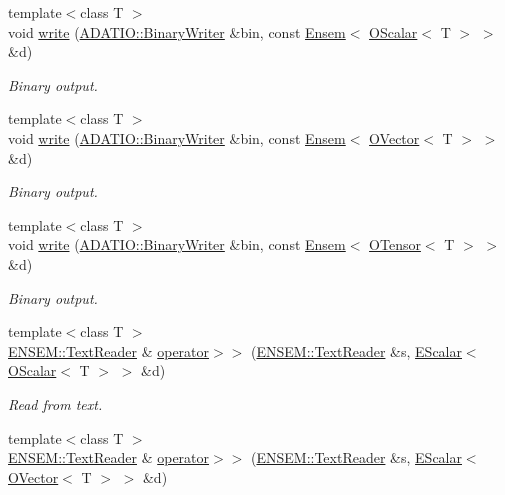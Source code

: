 \begin{DoxyCompactItemize}
{\footnotesize template$<$class T $>$ }\\void \mbox{\hyperlink{namespaceENSEM_afee4cf5df7a009f056b6ea0bca81c639}{write}} (\mbox{\hyperlink{classADATIO_1_1BinaryWriter}{A\+D\+A\+T\+I\+O\+::\+Binary\+Writer}} \&bin, const \mbox{\hyperlink{classENSEM_1_1Ensem}{Ensem}}$<$ \mbox{\hyperlink{classENSEM_1_1OScalar}{O\+Scalar}}$<$ T $>$ $>$ \&d)
\begin{DoxyCompactList}\small\item\em Binary output. \end{DoxyCompactList}\item 
{\footnotesize template$<$class T $>$ }\\void \mbox{\hyperlink{namespaceENSEM_a08ef39649c7f1ffb49d89bb6dc416676}{write}} (\mbox{\hyperlink{classADATIO_1_1BinaryWriter}{A\+D\+A\+T\+I\+O\+::\+Binary\+Writer}} \&bin, const \mbox{\hyperlink{classENSEM_1_1Ensem}{Ensem}}$<$ \mbox{\hyperlink{classENSEM_1_1OVector}{O\+Vector}}$<$ T $>$ $>$ \&d)
\begin{DoxyCompactList}\small\item\em Binary output. \end{DoxyCompactList}\item 
{\footnotesize template$<$class T $>$ }\\void \mbox{\hyperlink{namespaceENSEM_afe08b2232fc0a37c7998d170fcf26ec0}{write}} (\mbox{\hyperlink{classADATIO_1_1BinaryWriter}{A\+D\+A\+T\+I\+O\+::\+Binary\+Writer}} \&bin, const \mbox{\hyperlink{classENSEM_1_1Ensem}{Ensem}}$<$ \mbox{\hyperlink{classENSEM_1_1OTensor}{O\+Tensor}}$<$ T $>$ $>$ \&d)
\begin{DoxyCompactList}\small\item\em Binary output. \end{DoxyCompactList}\item 
{\footnotesize template$<$class T $>$ }\\\mbox{\hyperlink{classENSEM_1_1TextReader}{E\+N\+S\+E\+M\+::\+Text\+Reader}} \& \mbox{\hyperlink{namespaceENSEM_a50e3d2025db65f9542e1c884553a842b}{operator$>$$>$}} (\mbox{\hyperlink{classENSEM_1_1TextReader}{E\+N\+S\+E\+M\+::\+Text\+Reader}} \&s, \mbox{\hyperlink{classENSEM_1_1EScalar}{E\+Scalar}}$<$ \mbox{\hyperlink{classENSEM_1_1OScalar}{O\+Scalar}}$<$ T $>$ $>$ \&d)
\begin{DoxyCompactList}\small\item\em Read from text. \end{DoxyCompactList}\item 
{\footnotesize template$<$class T $>$ }\\\mbox{\hyperlink{classENSEM_1_1TextReader}{E\+N\+S\+E\+M\+::\+Text\+Reader}} \& \mbox{\hyperlink{namespaceENSEM_a14c9e48b1126ae8aad1c0ccc1b7e6e05}{operator$>$$>$}} (\mbox{\hyperlink{classENSEM_1_1TextReader}{E\+N\+S\+E\+M\+::\+Text\+Reader}} \&s, \mbox{\hyperlink{classENSEM_1_1EScalar}{E\+Scalar}}$<$ \mbox{\hyperlink{classENSEM_1_1OVector}{O\+Vector}}$<$ T $>$ $>$ \&d)

\end{DoxyCompactItemize}
